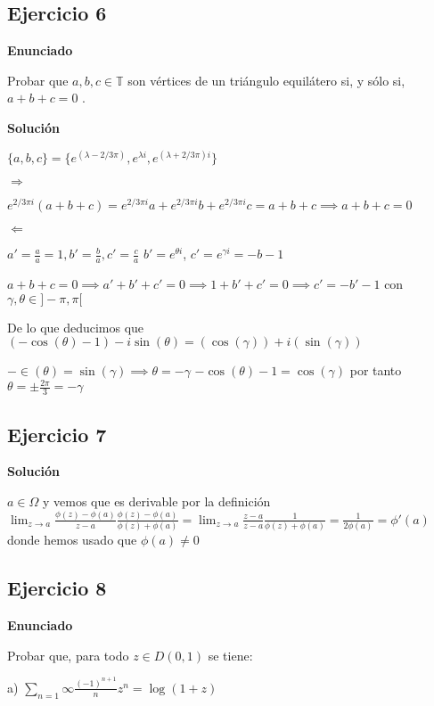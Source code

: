 \subsection{Ejercicio 6} %
\textbf{Enunciado}

Probar que $a, b, c \in\mathbb{T}$ son vértices de un triángulo equilátero si, y sólo si, $a+b+c = 0$ .


\textbf{Solución}

$\{ a,b,c \} = \{ e^(\lambda - 2/3\pi), e^{\lambda i}, e^{(\lambda + 2/3\pi)i} \}$

$\Rightarrow$

$e^{2/3\pi i} (a+b+c) = e^{2/3\pi i} a + e^{2/3\pi i}b + e^{2/3\pi i}c = a+b+c \implies a+b+c=0$

$\Leftarrow$

$a'=\frac{a}{a} = 1, b'=\frac{b}{a}, c'=\frac{c}{a}$
$b'=e^{\theta i}$, $c' = e^{\gamma i} = -b-1$


$a+b+c = 0 \implies a'+b'+c' = 0 \implies 1+b'+c' = 0 \implies c'=-b'-1$ con $\gamma,\theta\in ]-\pi,\pi[$

De lo que deducimos que 
$(-\cos(\theta)-1)-i\sin(\theta) = (\cos(\gamma)) + i(\sin(\gamma))$

$-\in(\theta) = \sin(\gamma) \implies \theta = -\gamma $
$-\cos(\theta) -1 =  \cos(\gamma)$
por tanto
$\theta = \pm\frac{2\pi}{3} = -\gamma$



\subsection{Ejercicio 7}




\textbf{Solución}

$a\in\Omega$ y vemos que es derivable por la definición
$\lim_{z\rightarrow a} \frac{\phi(z)-\phi(a)}{z-a} \frac{\phi(z)-\phi(a)}{\phi(z)+\phi(a)} = \lim_{z\rightarrow a} \frac{z-a}{z-a} \frac{1}{\phi(z)+\phi(a)} = \frac{1}{2\phi(a)} = \phi '(a)$
donde hemos usado que $\phi(a)\not = 0$




\subsection{Ejercicio 8}
\textbf{Enunciado}

Probar que, para todo $z \in D(0, 1)$ se tiene:

a) $\sum_{n=1}{\infty} \frac{(-1)^{n+1}}{n} z^n = \log(1+z)$



